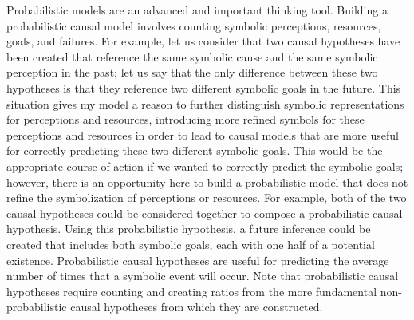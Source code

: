 Probabilistic models are an advanced and important thinking tool.
Building a probabilistic causal model involves counting symbolic
perceptions, resources, goals, and failures.  For example, let us
consider that two causal hypotheses have been created that reference
the same symbolic cause and the same symbolic perception in the past;
let us say that the only difference between these two hypotheses is
that they reference two different symbolic goals in the future.  This
situation gives my model a reason to further distinguish symbolic
representations for perceptions and resources, introducing more
refined symbols for these perceptions and resources in order to lead
to causal models that are more useful for correctly predicting these
two different symbolic goals.  This would be the appropriate course of
action if we wanted to correctly predict the symbolic goals; however,
there is an opportunity here to build a probabilistic model that does
not refine the symbolization of perceptions or resources.  For
example, both of the two causal hypotheses could be considered
together to compose a probabilistic causal hypothesis.  Using this
probabilistic hypothesis, a future inference could be created that
includes both symbolic goals, each with one half of a potential
existence.  Probabilistic causal hypotheses are useful for predicting
the average number of times that a symbolic event will occur.  Note
that probabilistic causal hypotheses require counting and creating
ratios from the more fundamental non-probabilistic causal hypotheses
from which they are constructed.

